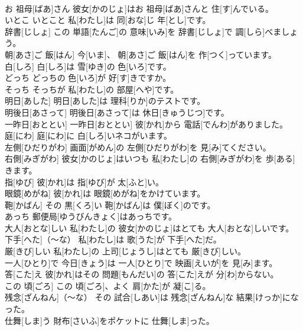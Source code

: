 \documentclass[8pt]{extreport}
\begin{document}
\begin{CJK}{UTF8}{min}
\\	お 祖母[ばあ]さん	彼女[かのじょ]はお 祖母[ばあ]さんと 住[す]んでいる。		
\\	いとこ	いとこと 私[わたし]は 同[おな]じ 年[とし]です。		
\\	辞書[じしょ]	この 単語[たんご]の 意味[いみ]を 辞書[じしょ]で 調[しら]べましょう。		
\\	朝[あさ]ご 飯[はん]	今[いま]、 朝[あさ]ご 飯[はん]を 作[つく]っています。		
\\	白[しろ]	白[しろ]は 雪[ゆき]の 色[いろ]です。		
\\	どっち	どっちの 色[いろ]が 好[す]きですか。		
\\	そっち	そっちが 私[わたし]の 部屋[へや]です。		
\\	明日[あした]	明日[あした]は 理科[りか]のテストです。		
\\	明後日[あさって]	明後日[あさって]は 休日[きゅうじつ]です。		
\\	一昨日[おととい]	一昨日[おととい] 彼[かれ]から 電話[でんわ]がありました。		
\\	庭[にわ]	庭[にわ]に 白[しろ]いネコがいます。		
\\	左側[ひだりがわ]	画面[がめん]の 左側[ひだりがわ]を 見[み]てください。		
\\	右側[みぎがわ]	彼女[かのじょ]はいつも 私[わたし]の 右側[みぎがわ]を 歩[ある]きます。		
\\	指[ゆび]	彼[かれ]は 指[ゆび]が 太[ふと]い。		
\\	眼鏡[めがね]	彼[かれ]は 眼鏡[めがね]をかけています。		
\\	鞄[かばん]	その 黒[くろ]い 鞄[かばん]は 僕[ぼく]のです。		
\\	あっち	郵便局[ゆうびんきょく]はあっちです。		
\\	大人[おとな]しい	私[わたし]の 彼女[かのじょ]はとても 大人[おとな]しいです。		
\\	下手[へた]（～な）	私[わたし]は 歌[うた]が 下手[へた]だ。		
\\	厳[きび]しい	私[わたし]の 上司[じょうし]はとても 厳[きび]しい。		
\\	一人[ひとり]で	今日[きょう]は 一人[ひとり]で 映画[えいが]を 見[み]ます。		
\\	答[こた]え	彼[かれ]はその 問題[もんだい]の 答[こた]えが 分[わ]からない。		
\\	この 頃[ごろ]	この 頃[ごろ]、よく 肩[かた]が 凝[こ]る。		
\\	残念[ざんねん]（～な）	その 試合[しあい]は 残念[ざんねん]な 結果[けっか]になった。		
\\	仕舞[しま]う	財布[さいふ]をポケットに 仕舞[しま]った。		

\end{CJK}
\end{document}
